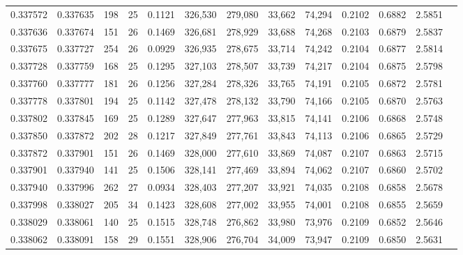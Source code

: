 \begin{tabular}{rrrrrrrrrrrrr}
0.337572 & 0.337635 &   198 &  25 &                                     0.1121 & 326,530 & 279,080 &  33,662 &  74,294 & 0.2102 & 0.6882 & 2.5851 \\
0.337636 & 0.337674 &   151 &  26 &                                     0.1469 & 326,681 & 278,929 &  33,688 &  74,268 & 0.2103 & 0.6879 & 2.5837 \\
0.337675 & 0.337727 &   254 &  26 &                                     0.0929 & 326,935 & 278,675 &  33,714 &  74,242 & 0.2104 & 0.6877 & 2.5814 \\
0.337728 & 0.337759 &   168 &  25 &                                     0.1295 & 327,103 & 278,507 &  33,739 &  74,217 & 0.2104 & 0.6875 & 2.5798 \\
0.337760 & 0.337777 &   181 &  26 &                                     0.1256 & 327,284 & 278,326 &  33,765 &  74,191 & 0.2105 & 0.6872 & 2.5781 \\
0.337778 & 0.337801 &   194 &  25 &                                     0.1142 & 327,478 & 278,132 &  33,790 &  74,166 & 0.2105 & 0.6870 & 2.5763 \\
0.337802 & 0.337845 &   169 &  25 &                                     0.1289 & 327,647 & 277,963 &  33,815 &  74,141 & 0.2106 & 0.6868 & 2.5748 \\
0.337850 & 0.337872 &   202 &  28 &                                     0.1217 & 327,849 & 277,761 &  33,843 &  74,113 & 0.2106 & 0.6865 & 2.5729 \\
0.337872 & 0.337901 &   151 &  26 &                                     0.1469 & 328,000 & 277,610 &  33,869 &  74,087 & 0.2107 & 0.6863 & 2.5715 \\
0.337901 & 0.337940 &   141 &  25 &                                     0.1506 & 328,141 & 277,469 &  33,894 &  74,062 & 0.2107 & 0.6860 & 2.5702 \\
0.337940 & 0.337996 &   262 &  27 &                                     0.0934 & 328,403 & 277,207 &  33,921 &  74,035 & 0.2108 & 0.6858 & 2.5678 \\
0.337998 & 0.338027 &   205 &  34 &                                     0.1423 & 328,608 & 277,002 &  33,955 &  74,001 & 0.2108 & 0.6855 & 2.5659 \\
0.338029 & 0.338061 &   140 &  25 &                                     0.1515 & 328,748 & 276,862 &  33,980 &  73,976 & 0.2109 & 0.6852 & 2.5646 \\
0.338062 & 0.338091 &   158 &  29 &                                     0.1551 & 328,906 & 276,704 &  34,009 &  73,947 & 0.2109 & 0.6850 & 2.5631 \\

\end{tabular}
